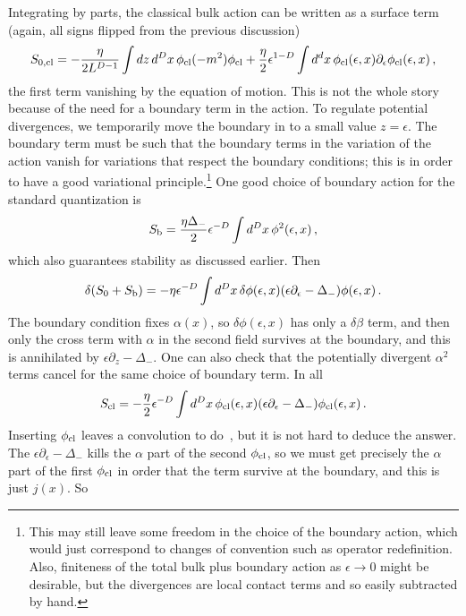 \documentclass[12pt]{article}
\begin{document}
{Integrating by parts, the classical bulk action can be written as a surface term (again, all signs flipped from the previous discussion)
\begin{equation}
S_{0,\rm cl} = -\frac{\eta}{2L^{D-1}} \int dz\, d^Dx\,\phi_{\rm cl} ( \Box - m^2) \phi_{\rm cl} 
+ \frac{\eta}{2} \epsilon^{1-D} \int d^dx \,\phi_{\rm cl}(\epsilon, x) \partial_\epsilon \phi_{\rm cl}(\epsilon, x) \,,
\end{equation}
the first term vanishing by the equation of motion.  This is not the whole story because of the need for a boundary term in the action.
To regulate potential divergences, we temporarily move the boundary in to a small value $z = \epsilon$.  The boundary term must be such that the boundary terms in the variation of the action vanish for variations that respect the boundary conditions; this is in order to have a good variational principle.\footnote{This may still leave some freedom in the choice of the boundary action, which would just correspond to changes of convention such as operator redefinition.  Also, finiteness  of the total bulk plus boundary action as $\epsilon \to 0$ might be desirable, but the divergences are local contact terms and so easily subtracted by hand.}  One good choice of boundary action for the standard quantization is
\begin{equation}
S_{\rm b} =  \frac{ \eta\Delta_-}{2} \epsilon^{-D}  \int{d^Dx}\, \phi^2(\epsilon, x) \,,
\end{equation}
which also guarantees stability as discussed earlier.
Then 
\begin{equation}
\delta(S_0 + S_{\rm b}) = -{\eta} \epsilon^{-D} \int d^Dx \, \delta\phi(\epsilon, x) (\epsilon\partial_\epsilon  - \Delta_-)\phi(\epsilon, x) \,.
\end{equation}
The boundary condition fixes $\alpha(x)$, so $\delta\phi(\epsilon,x)$ has only a $\delta\beta$ term, and then only the cross term with $\alpha$ in the second field survives at the boundary, and this is annihilated by  $\epsilon\partial_z  - \Delta_-$.  One can also check that the potentially divergent $\alpha^2$ terms cancel for the same choice of boundary term.  In all
\begin{equation}
S_{\rm cl}  =  -\frac{\eta}{2} \epsilon^{-D} \int d^Dx \,\phi_{\rm cl}(\epsilon, x) (\epsilon \partial_\epsilon - \Delta_-)\phi_{\rm cl}(\epsilon, x) \,.
\end{equation}
Inserting $\phi_{\rm cl}$ leaves a convolution to do~\cite{W,mcgnotes}, but it is not hard to deduce the answer.  The $\epsilon \partial_\epsilon - \Delta_-$ kills the $\alpha$ part of the second $\phi_{\rm cl}$, so we must get precisely the $\alpha$ part of the first $\phi_{\rm cl}$ in order that the term survive at the boundary, and this is just $j(x)$.  So
}
\end{document}
